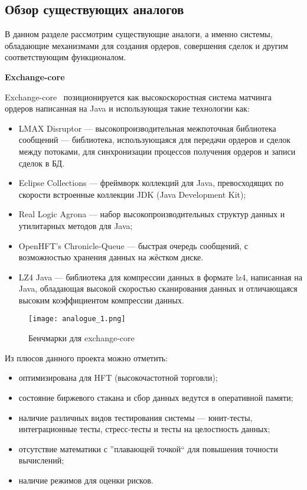 \subsection{Обзор существующих аналогов}\label{sec:analysis:analogues}

В данном разделе рассмотрим существующие аналоги, а именно системы, обладающие механизмами для создания ордеров, совершения сделок и другим соответствующим функционалом.

\textbf{Exchange-core}

Exchange-core~\cite{analogue_1} позиционируется как высокоскоростная система матчинга ордеров написанная на Java и использующая такие технологии как:
\begin{itemize}
    \item LMAX Disruptor — высокопроизводительная межпоточная библиотека сообщений — библиотека, использующаяся для передачи ордеров и сделок между потоками, для синхронизации процессов получения ордеров и записи сделок в БД.
    \item Eclipse Collections — фреймворк коллекций для Java, превосходящих по скорости встроенные коллекции JDK (Java Development Kit);
    \item Real Logic Agrona — набор высокопроизводительных структур данных и утилитарных методов для Java;
    \item OpenHFT's Chronicle-Queue — быстрая очередь сообщений, с возможностью хранения данных на жёстком диске.
    \item LZ4 Java — библиотека для компрессии данных в формате lz4, написанная на Java, обладающая высокой скоростью сканирования данных и отличающаяся высоким коэффициентом компрессии данных.
\end{itemize}

\begin{figure}[ht]
    \centering
	\texttt{[image: analogue\_1.png]}
	\caption{Бенчмарки для exchange-core}\label{fig:analysis:analogue_1:picture}
\end{figure}

Из плюсов данного проекта можно отметить:
\begin{itemize}
    \item оптимизирована для HFT (высокочастотной торговли);
    \item состояние биржевого стакана и сбор данных ведутся в оперативной памяти;
    \item наличие различных видов тестирования системы — юнит-тесты, интеграционные тесты, стресс-тесты и тесты на целостность данных;
    \item отсутствие математики с ''плавающей точкой`` для повышения точности вычислений;
    \item наличие режимов для оценки рисков.
\end{itemize}

